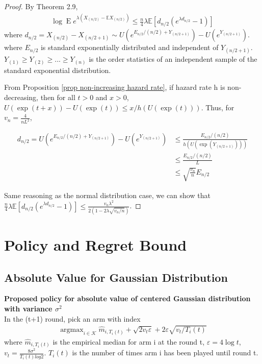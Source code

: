 \documentclass{article}
\DeclareMathOperator*{\argmax}{argmax}
\theoremstyle{plain}
\begin{document}
\begin{proof}
By \cite{boucheron2012} Theorem 2.9, 
\begin{align}
    \log \operatorname{E} e^{\lambda\left(X_{(n / 2)}-\mathbb{E} X_{(n / 2)}\right)} \leq \frac{n}{4} \lambda \mathbb{E}\left[d_{n / 2}\left(e^{\lambda d_{n / 2}}-1\right)\right]
\end{align}
where $d_{n / 2}=X_{(n / 2)}-X_{(n / 2+1)} \sim U\left(e^{E_{n / 2} /(n / 2)+Y_{(n / 2+1)}} \right)-U\left(e^{Y_{(n / 2+1)}}\right).$ where $E_{n/2}$ is standard exponentially distributed and independent of $Y_{(n/2 + 1)}$. $Y_{(1)} \geq Y_{(2)} \geq ... \geq Y_{(n)}$ is the order statistics of an independent sample of the standard exponential distribution. 

From Proposition \ref{prop non-increasing hazard rate}, if hazard rate h is non-decreasing, then for all $t > 0$ and $x > 0$, $U(\exp (t+x))-U(\exp (t)) \leq x / h(U(\exp (t)))$. Thus, for $v_n = \frac{4}{n L^2}$,

\begin{align}
    d_{n/2} = U\left(e^{E_{n / 2} /(n / 2)+Y_{(n / 2+1)}} \right)-U\left(e^{Y_{(n / 2+1)}}\right) 
    & \leq \frac{E_{n / 2} /(n / 2)}{h(U(\exp{(Y_{(n/2+1)})}))}\\
    &\leq \frac{E_{n / 2} /(n / 2)}{L}\\
    & \leq \sqrt{\frac{v_n}{n}} E_{n/2}
\end{align}

Same reasoning as the normal distribution case, we can show that $\frac{n}{4} \lambda \mathbb{E}\left[d_{n / 2}\left(e^{\lambda d_{n / 2}}-1\right)\right] \leq \frac{v_{n} \lambda^{2}}{2\left(1-2 \lambda \sqrt{v_{n} / n}\right)}$.
\end{proof}


    
    
\section{Policy and Regret Bound}

\subsection{Absolute Value for Gaussian Distribution}

\textbf{Proposed policy for absolute value of centered Gaussian distribution with variance $\sigma^2$}\\
In the (t+1) round, pick an arm with index 
\begin{align}
    \label{policy normal}
   \argmax_{i \in \mathcal{K}} \hat{m}_{i, T_i(t)} + \sqrt{2v_t \varepsilon} + 2 \varepsilon \sqrt{v_t/T_i(t)}
\end{align}
where $\hat{m}_{i, T_i(t)}$ is the empirical median for arm i at the round t, $\varepsilon = 4 \log t$, $v_t = \frac{8 \sigma^2}{T_i(t) log2}$. $T_i(t)$ is the number of times arm i has been played until round t.  
\end{document}
